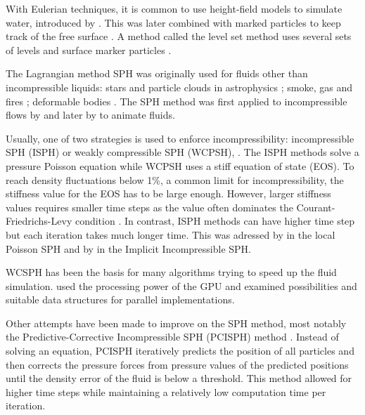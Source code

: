 \documentclass[../../main.tex]{subfiles}
\begin{document}
\tracingall

\label{ch:related}

With Eulerian techniques, it is common to use height-field models to simulate water, introduced by \citet{kass1990rapid}. This was later combined with marked particles to keep track of the free surface \citep{foster1996realistic}. A method called the level set method uses several sets of levels and surface marker particles \citep{enright2002hybrid}. 

The Lagrangian method SPH was originally used for fluids other than incompressible liquids: stars and particle clouds in astrophysics \citep{lucy1977numerical, gingold1977smoothed}; smoke, gas and fires \citep{stam1995depicting}; deformable bodies \citep{desbrun1996smoothed}. The SPH method was first applied to incompressible flows by \citet{monaghan1994simulating} and later by \citet{muller2003particle} to animate fluids. 

Usually, one of two strategies is used to enforce incompressibility: incompressible SPH (ISPH) or weakly compressible SPH (WCPSH), \citep{becker2007weakly}. The ISPH methods solve a pressure Poisson equation while WCPSH uses a stiff equation of state (EOS). To reach density fluctuations below 1\%, a common limit for incompressibility, the stiffness value for the EOS has to be large enough. However, larger stiffness values requires smaller time steps as the value often dominates the Courant-Friedrichs-Levy condition \citep{solenthaler2009predictive}. In contrast, ISPH methods can have higher time step but each iteration takes much longer time. This was adressed by \citet{he2012local} in the local Poisson SPH and by \citet{ihmsen2014implicit} in the Implicit Incompressible SPH. 

WCSPH has been the basis for many algorithms trying to speed up the fluid simulation. \citet{goswami2010interactive} used the processing power of the GPU and \citet{ihmsen2011parallel} examined possibilities and suitable data structures for parallel implementations. 

Other attempts have been made to improve on the SPH method, most notably the Predictive-Corrective Incompressible SPH (PCISPH) method \citep{solenthaler2009predictive}. Instead of solving an equation, PCISPH iteratively predicts the position of all particles and then corrects the pressure forces from pressure values of the predicted positions until the density error of the fluid is below a threshold. This method allowed for higher time steps while maintaining a relatively low computation time per iteration. 
\end{document}
